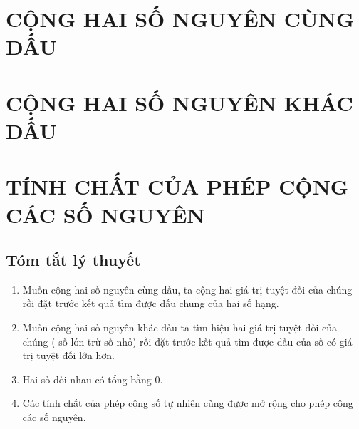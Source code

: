 \section{CỘNG HAI SỐ NGUYÊN CÙNG DẤU}
\section{CỘNG HAI SỐ NGUYÊN KHÁC DẤU}
\section{TÍNH CHẤT CỦA PHÉP CỘNG CÁC SỐ NGUYÊN}
\subsection{Tóm tắt lý thuyết}
\begin{enumerate}
	\item Muốn cộng hai số nguyên cùng dấu, ta cộng hai giá trị tuyệt đối của chúng rồi đặt trước kết quả tìm được dấu chung của hai số hạng.
	\item Muốn cộng hai số nguyên khác dấu ta tìm hiệu hai giá trị tuyệt đối của chúng ( số lớn trừ số nhỏ) rồi đặt trước kết quả tìm được dấu của số có giá trị tuyệt đối lớn hơn.
	\item Hai số đối nhau có tổng bằng $0$.
	\item Các tính chất của phép cộng số tự nhiên cũng được mở rộng cho phép cộng các số nguyên.
\end{enumerate}


